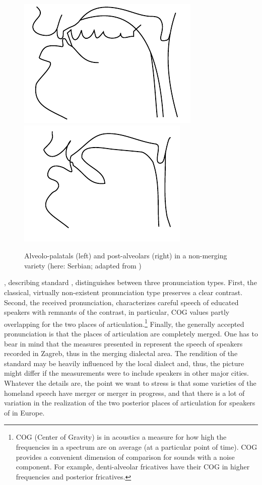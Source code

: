\documentclass[output=paper,modfonts,newtxmath,hidelinks,]{langscibook}
\begin{document}
\begin{figure}
\includegraphics[width=.45\textwidth]{figures/MCFigure2left.pdf}
\includegraphics[width=.45\textwidth]{figures/MCFigure2right.pdf}
\caption{\label{fig:mihajlovic:2} Alveolo-palatals (left) and post-alveolars (right) in a non-merging variety (here: Serbian; adapted from \citealt{Miletic1958})}
\end{figure}


\citet{Skaric2009}, %
describing standard , distinguishes between three pronunciation types. First, the classical, virtually non-existent pronunciation type preserves a clear contrast. Second, the received pronunciation, characterizes careful speech of educated speakers with remnants of the contrast, in particular, COG values partly overlapping for the two places of articulation.\footnote{COG (Center of Gravity) is in acoustics a measure for how high the frequencies in a spectrum are on average (at a particular point of time). COG provides a convenient dimension of comparison for sounds with a noise component. For example, denti-alveolar fricatives have their COG in higher frequencies and posterior fricatives.} Finally, the generally accepted pronunciation is that the places of articulation are completely merged. One has to bear in mind that the measures presented in \citet{Skaric2009} represent the speech of speakers recorded in Zagreb, thus in the merging dialectal area. The rendition of the standard may be heavily influenced by the local dialect and, thus, the picture might differ if the measurements were to include speakers in other  major cities. Whatever the details are, the point we want to stress is that some varieties of the homeland speech have merger or merger in progress, and that there is a lot of variation in the realization of the two posterior places of articulation for speakers of  in Europe.
\end{document}

